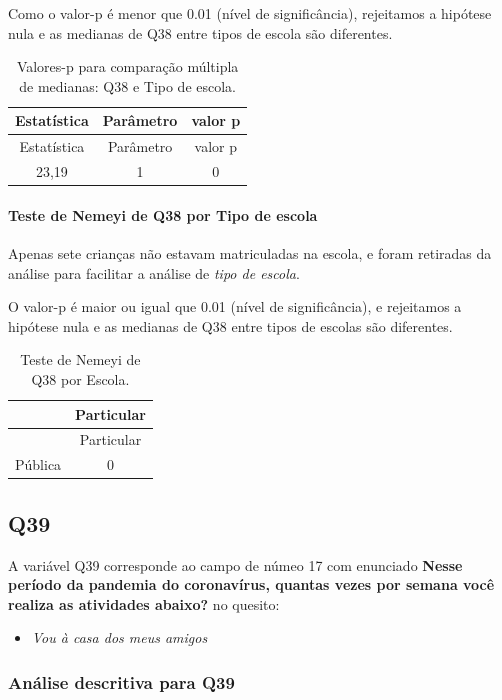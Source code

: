 \documentclass[]{article}
\providecommand{\tightlist}{%
  \setlength{\itemsep}{0pt}\setlength{\parskip}{0pt}}
\let\oldparagraph\paragraph
\renewcommand{\paragraph}[1]{\oldparagraph{#1}\mbox{}}
\begin{document}
Como o valor-p é menor que 0.01 (nível de significância), rejeitamos a hipótese nula e as medianas de Q38 entre tipos de escola são diferentes.

\begin{longtable}[]{@{}ccc@{}}
\caption{\label{tab:unnamed-chunk-1476}Valores-p para comparação múltipla de medianas: Q38 e Tipo de escola.}\tabularnewline
\toprule
Estatística & Parâmetro & valor p\tabularnewline
\midrule
\endfirsthead
\toprule
Estatística & Parâmetro & valor p\tabularnewline
\midrule
\endhead
23,19 & 1 & 0\tabularnewline
\bottomrule
\end{longtable}

\hypertarget{teste-de-nemeyi-de-q38-por-tipo-de-escola}{%
\paragraph{Teste de Nemeyi de Q38 por Tipo de escola}\label{teste-de-nemeyi-de-q38-por-tipo-de-escola}}

Apenas sete crianças não estavam matriculadas na escola, e foram retiradas da análise para facilitar a análise de \emph{tipo de escola}.

O valor-p é maior ou igual que 0.01 (nível de significância), e rejeitamos a hipótese nula e as medianas de Q38 entre tipos de escolas são diferentes.

\begin{longtable}[]{@{}lc@{}}
\caption{\label{tab:unnamed-chunk-1478}Teste de Nemeyi de Q38 por Escola.}\tabularnewline
\toprule
& Particular\tabularnewline
\midrule
\endfirsthead
\toprule
& Particular\tabularnewline
\midrule
\endhead
Pública & 0\tabularnewline
\bottomrule
\end{longtable}

\cleardoublepage

\hypertarget{q39}{%
\subsection{Q39}\label{q39}}

A variável Q39 corresponde ao campo de númeo 17 com enunciado \textbf{Nesse período da pandemia do coronavírus, quantas vezes por semana você realiza as atividades abaixo?} no quesito:

\begin{itemize}
\tightlist
\item
  \emph{Vou à casa dos meus amigos}
\end{itemize}

\hypertarget{anuxe1lise-descritiva-para-q39}{%
\subsubsection{Análise descritiva para Q39}\label{anuxe1lise-descritiva-para-q39}}
\end{document}
